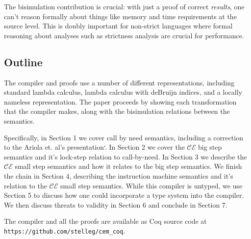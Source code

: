 The bisimulation contribution is crucial: with just a proof of correct
\emph{results}, one can't reason formally about things like memory and time
requirements at the source level. This is doubly important for non-strict
languages where formal reasoning about analyses such as strictness analysis
are crucial for performance.

\subsection{Outline}
The compiler and proofs use a number of different representations, including
standard lambda calculus, lambda calculus with deBruijn indices, and a locally
nameless representation. The paper proceeds by showing each transformation that
the compiler makes, along with the bisimulation relations between the semantics.

Specifically, in Section 1 we cover call by need semantics, including a
correction to the Ariola et. al's presentation`\cite{ariola1995call}. In Section
2 we cover the $\mathcal{CE}$ big step semantics and it's lock-step relation to
call-by-need.  In Section 3 we describe the $\mathcal{CE}$ small step semantics
and how it relates to the big step semantics. We finish the chain in Section 4,
describing the instruction machine semantics and it's relation to the
$\mathcal{CE}$ small step semantics. While this compiler is untyped, we use
Section 5 to discuss how one could incorporate a type system into the compiler.
We then discuss threats to validity in Section 6 and conclude in Section 7. 

The compiler and all the proofs are available as Coq source code at
\texttt{https://github.com/stelleg/cem\_coq}.


